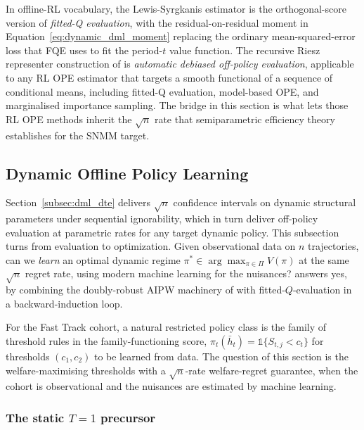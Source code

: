 In offline-RL vocabulary, the Lewis-Syrgkanis estimator is the orthogonal-score version of \emph{fitted-Q evaluation}, with the residual-on-residual moment in Equation~\eqref{eq:dynamic_dml_moment} replacing the ordinary mean-squared-error loss that FQE uses to fit the period-$t$ value function. The recursive Riesz representer construction of \citet{chernozhukov2023automatic} is \emph{automatic debiased off-policy evaluation}, applicable to any RL OPE estimator that targets a smooth functional of a sequence of conditional means, including fitted-Q evaluation, model-based OPE, and marginalised importance sampling. The bridge in this section is what lets those RL OPE methods inherit the $\sqrt n$ rate that semiparametric efficiency theory establishes for the SNMM target.

\subsection{Dynamic Offline Policy Learning}
\label{subsec:dynamic_offline_policy}

Section~\ref{subsec:dml_dte} delivers $\sqrt n$ confidence intervals on dynamic structural parameters under sequential ignorability, which in turn deliver off-policy evaluation at parametric rates for any target dynamic policy. This subsection turns from evaluation to optimization. Given observational data on $n$ trajectories, can we \emph{learn} an optimal dynamic regime $\pi^* \in \arg\max_{\pi \in \Pi} V(\pi)$ at the same $\sqrt n$ regret rate, using modern machine learning for the nuisances? \citet{sakaguchi2024dynamicpolicy} answers yes, by combining the doubly-robust AIPW machinery of \citet{athey2021policy} with fitted-$Q$-evaluation in a backward-induction loop.

For the Fast Track cohort, a natural restricted policy class is the family of threshold rules in the family-functioning score, $\pi_t(\bar h_t) = \mathbb 1\{S_{t,j} < c_t\}$ for thresholds $(c_1, c_2)$ to be learned from data. The question of this section is the welfare-maximising thresholds with a $\sqrt n$-rate welfare-regret guarantee, when the cohort is observational and the nuisances are estimated by machine learning.

\subsubsection*{The static $T=1$ precursor}

